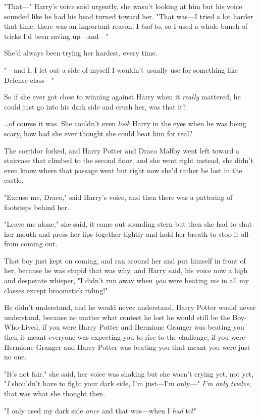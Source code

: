 "That---" Harry's voice said urgently, she wasn't looking at him but his voice
sounded like he had his head turned toward her. "That was---I tried a lot
harder that time, there was an important reason, I \emph{had} to, so I used a
whole bunch of tricks I'd been saving up---and---"

She'd always been trying her hardest, every time.

"---and I, I let out a side of myself I wouldn't usually use for something like
Defense class---"

So if she ever got close to winning against Harry when it \emph{really}
mattered, he could just go into his dark side and crush her, was that it?

{\ldots}of course it was. She couldn't even \emph{look} Harry in the eyes when
he was being scary, how had she ever thought she could beat him for real?

The corridor forked, and Harry Potter and Draco Malfoy went left toward a
staircase that climbed to the second floor, and she went right instead, she
didn't even know where that passage went but right now she'd rather be lost in
the castle.

"Excuse me, Draco," said Harry's voice, and then there was a pattering of
footsteps behind her.

"Leave me alone," she said, it came out sounding stern but then she had to shut
her mouth and press her lips together tightly and hold her breath to stop it
all from coming out.

That boy just kept on coming, and ran around her and put himself in front of
her, because he was stupid that was why, and Harry said, his voice now a high
and desperate whisper, "I didn't run away when \emph{you} were beating
\emph{me} in all my classes except broomstick riding!"

He didn't understand, and he would never understand, Harry Potter would never
understand, because no matter what contest he lost he would still be the
Boy-Who-Lived, if you were Harry Potter and Hermione Granger was beating you
then it meant everyone was expecting you to rise to the challenge, if you were
Hermione Granger and Harry Potter was beating you that meant you were just no
one.

"It's not fair," she said, her voice was shaking but she wasn't crying yet, not
yet, "\emph{I} shouldn't have to fight your dark side, I'm just---I'm only---"
\emph{I'm only twelve,} that was what she thought then.

"I only used my dark side \emph{once} and that was---when I \emph{had} to!"

